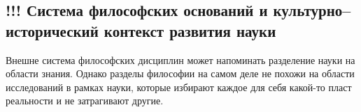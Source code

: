 
\subsection{!!! Система философских оснований и культурно--исторический контекст развития
науки}

Внешне система философских дисциплин может напоминать разделение науки на области знания. 
Однако разделы философии на самом деле не похожи на области исследований
в рамках науки, которые избирают каждое для себя какой-то пласт реальности и не
затрагивают другие. 

